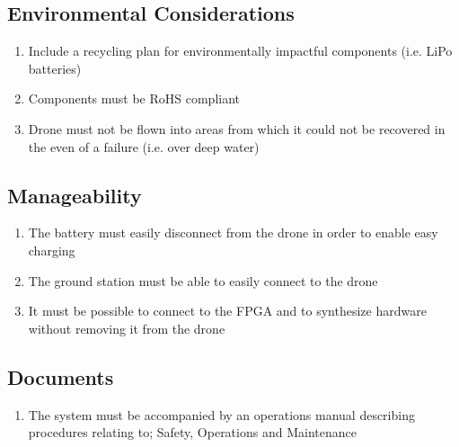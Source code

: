 \documentclass[10pt,letterpaper]{article}
\begin{document}
\subsection{Environmental Considerations}
\begin{enumerate}[label=C.EN.\arabic*, wide=1cm, widest=3cm, leftmargin=*, font=\bfseries, noitemsep,topsep=0pt, parsep=4pt, partopsep=0pt]
    \item Include a recycling plan for environmentally impactful components (i.e. LiPo batteries)
    \item Components must be RoHS compliant
    \item Drone must not be flown into areas from which it could not be recovered in the even of a failure (i.e. over deep water)
\end{enumerate}

\subsection{Manageability}
\begin{enumerate}[label=C.MG.\arabic*, wide=1cm, widest=3cm, leftmargin=*, font=\bfseries, noitemsep,topsep=0pt, parsep=4pt, partopsep=0pt]
    \item The battery must easily disconnect from the drone in order to enable easy charging
    \item The ground station must be able to easily connect to the drone
    \item It must be possible to connect to the FPGA and to synthesize hardware without removing it from the drone
\end{enumerate}

\subsection{Documents}
\begin{enumerate}[label=C.DD.\arabic*, wide=1cm, widest=3cm, leftmargin=*, font=\bfseries, noitemsep,topsep=0pt, parsep=4pt, partopsep=0pt]
    \item  The system must be accompanied by an operations manual describing procedures relating to; Safety, Operations and Maintenance
\end{enumerate}

\clearpage
{}



\end{document}
